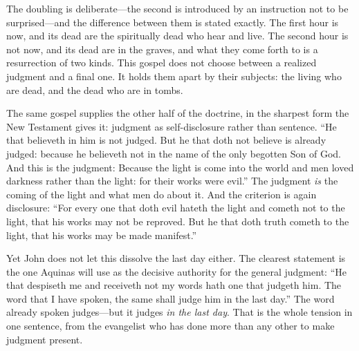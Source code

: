 The doubling is deliberate---the second is introduced by an instruction not to be surprised---and the difference between them is stated exactly. The first hour is now, and its dead are the spiritually dead who hear and live. The second hour is not now, and its dead are in the graves, and what they come forth to is a resurrection of two kinds. This gospel does not choose between a realized judgment and a final one. It holds them apart by their subjects: the living who are dead, and the dead who are in tombs.

The same gospel supplies the other half of the doctrine, in the sharpest form the New Testament gives it: judgment as self-disclosure rather than sentence. ``He that believeth in him is not judged. But he that doth not believe is already judged: because he believeth not in the name of the only begotten Son of God. And this is the judgment: Because the light is come into the world and men loved darkness rather than the light: for their works were evil.'' The judgment \emph{is} the coming of the light and what men do about it. And the criterion is again disclosure: ``For every one that doth evil hateth the light and cometh not to the light, that his works may not be reproved. But he that doth truth cometh to the light, that his works may be made manifest.''

Yet John does not let this dissolve the last day either. The clearest statement is the one Aquinas will use as the decisive authority for the general judgment: ``He that despiseth me and receiveth not my words hath one that judgeth him. The word that I have spoken, the same shall judge him in the last day.'' The word already spoken judges---but it judges \emph{in the last day}. That is the whole tension in one sentence, from the evangelist who has done more than any other to make judgment present.

